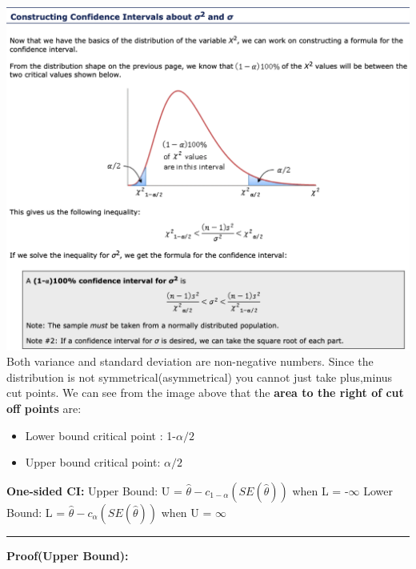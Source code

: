 \documentclass[]{article}
\begin{document}
\newline\includegraphics[scale=0.53]{ci_chi_square_distribution}
\newline
\newline Both variance and standard deviation are non-negative numbers. 
\newline\newline Since the distribution is not symmetrical(asymmetrical) you cannot just take plus,minus cut points. We can see from the image above that the \textbf{area to the right of cut off points} are:
\begin{itemize}
	\item Lower bound critical point : 1-$\alpha /2$ 
	\item Upper bound critical point: $\alpha /2$\newline\newline
\end{itemize}
\Large\textbf{One-sided CI:}
\newline Upper Bound: U = $\hat\theta - c_{1- \alpha }(SE(\hat\theta))$ when  L = -$\infty$
\newline
\newline Lower Bound: L = $\hat\theta - c_{\alpha }(SE(\hat\theta))$ when  U = $\infty$
\newline
\newline\Large\rule{3.0cm}{0pt} \textbf{Proof(Upper Bound):}
\end{document}

